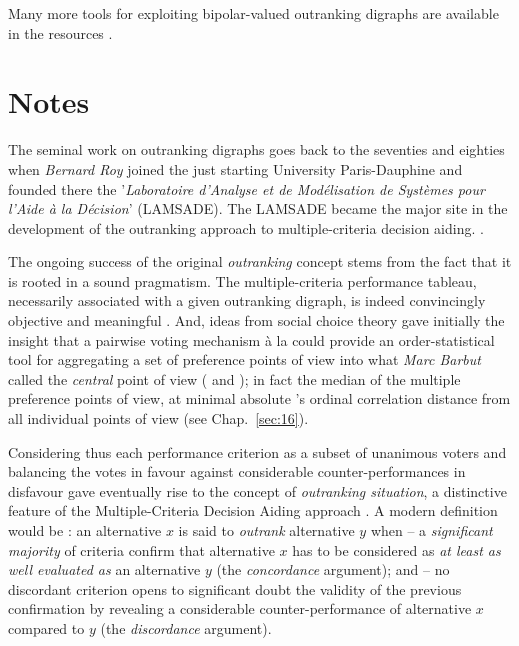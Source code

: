 Many more tools for exploiting bipolar-valued outranking digraphs are available in the \Digraph resources \citep{BIS-2021b}.

{}
\section*{Notes}

The seminal work on outranking digraphs goes back to the seventies and eighties when \emph{Bernard Roy} joined the just starting University Paris-Dauphine and founded there the '\emph{Laboratoire d’Analyse et de Modélisation de Systèmes pour l’Aide à la Décision}' (LAMSADE). The LAMSADE became the major site in the development of the outranking approach to multiple-criteria decision aiding. \citep*{ROY-1993}.

The ongoing success of the original \emph{outranking} concept stems from the fact that it is rooted in a sound pragmatism. The multiple-criteria performance tableau, necessarily associated with a given outranking digraph, is indeed convincingly objective and meaningful \citep{ROY-1991}. And, ideas from social choice theory gave initially the insight that a pairwise voting mechanism à la \Condorcet could provide an order-statistical tool for aggregating a set of preference points of view into what \emph{Marc Barbut} called the \emph{central} \Condorcet point of view (\citealp{CON-1784} and \citealp{BAR-1980}); in fact the median of the multiple preference points of view, at minimal absolute \Kendall's ordinal correlation distance from all individual points of view (see Chap.~\ref{sec:16}).

Considering thus each performance criterion as a subset of unanimous voters and balancing the votes in favour against considerable counter-performances in disfavour gave eventually rise to the concept of \emph{outranking situation}, a distinctive feature of the Multiple-Criteria Decision Aiding approach \citep{BIS-2015}.  A modern definition would be : an alternative $x$ is said to \emph{outrank} alternative $y$ when – a \emph{significant majority} of criteria confirm that alternative $x$ has to be considered as \emph{at least as well evaluated as} an alternative $y$ (the \emph{concordance} argument); and – no discordant criterion opens to significant doubt the validity of the previous confirmation by revealing a considerable counter-performance of alternative $x$ compared to $y$ (the \emph{discordance} argument).

